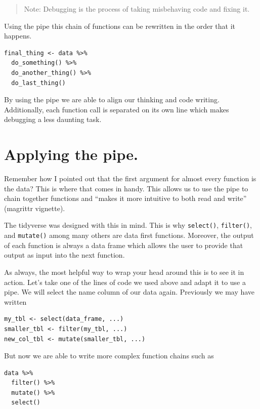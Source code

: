 \documentclass[
]{book}
\begin{document}
\begin{quote}
Note: Debugging is the process of taking misbehaving code and fixing it.
\end{quote}

Using the pipe this chain of functions can be rewritten in the order that it happens.

\begin{verbatim}
final_thing <- data %>% 
  do_something() %>% 
  do_another_thing() %>% 
  do_last_thing()
\end{verbatim}

By using the pipe we are able to align our thinking and code writing. Additionally, each function call is separated on its own line which makes debugging a less daunting task.

\hypertarget{applying-the-pipe.}{%
\section{Applying the pipe.}\label{applying-the-pipe.}}

Remember how I pointed out that the first argument for almost every function is the data? This is where that comes in handy. This allows us to use the pipe to chain together functions and ``makes it more intuitive to both read and write'' (magrittr vignette).

The tidyverse was designed with this in mind. This is why \texttt{select()}, \texttt{filter()}, and \texttt{mutate()} among many others are data first functions. Moreover, the output of each function is always a data frame which allows the user to provide that output as input into the next function.

As always, the most helpful way to wrap your head around this is to see it in action. Let's take one of the lines of code we used above and adapt it to use a pipe. We will select the name column of our data again. Previously we may have written

\begin{verbatim}
my_tbl <- select(data_frame, ...)
smaller_tbl <- filter(my_tbl, ...)
new_col_tbl <- mutate(smaller_tbl, ...)
\end{verbatim}

But now we are able to write more complex function chains such as

\begin{verbatim}
data %>% 
  filter() %>% 
  mutate() %>% 
  select()
\end{verbatim}
\end{document}
